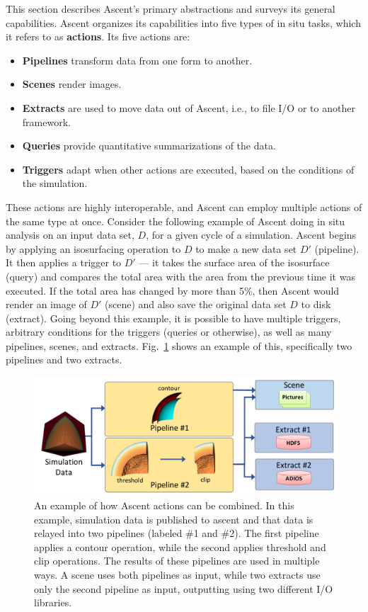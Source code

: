 This section describes Ascent's primary abstractions and surveys its general capabilities.
%
Ascent organizes its capabilities into five types of in situ tasks, which
it refers to as \textbf{actions}.
%
Its five actions are:
\begin{itemize}
\item \textbf{Pipelines} transform data from one form to another.
%
\item \textbf{Scenes} render images.
%
\item \textbf{Extracts} are used to move data out of Ascent, i.e., to file I/O or to another framework.
%
\item \textbf{Queries} provide quantitative summarizations of the data.
%
\item \textbf{Triggers} adapt when other actions are executed, based on the conditions of the simulation.
%
\end{itemize}

These actions are highly interoperable, and Ascent can employ multiple actions of the same type
at once.
%
Consider the following example of Ascent doing in situ analysis on an input data set, $D$,
for a given cycle of a simulation.
%
Ascent begins by applying an isosurfacing operation to $D$ to make a new data set $D'$ (pipeline).
%
It then applies a trigger to $D'$ --- it takes the surface area of the isosurface (query) and compares
the total area with the area from the previous time it was executed.
%
If the total area has changed by more than 5\%, then Ascent would render an image of $D'$ (scene)
and also save the original data set $D$ to disk (extract).
%
Going beyond this example, it is possible to have multiple triggers, arbitrary conditions for
the triggers (queries or otherwise), as well as many pipelines, scenes, and extracts.
%
Fig.~\ref{fig:ascent_example} shows an example of this, specifically two pipelines and two extracts.

\begin{figure}
\centering
\includegraphics[width=\textwidth]{images/ascent_actions_diagram_x2.pdf}
\caption{\label{fig:ascent_example} An example of how Ascent actions can be combined.
In this example, simulation data is published to ascent
and that data is relayed into two pipelines (labeled \#1 and \#2).
The first pipeline applies a contour operation, while the second
applies threshold and clip operations.
%
The results of these pipelines are used in multiple ways.
A scene uses both pipelines as input, while two extracts use only the second pipeline
as input, outputting using two different I/O libraries.}
\end{figure}

